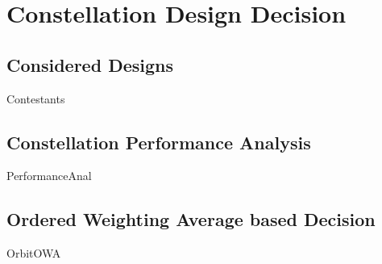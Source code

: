 \chapter{Constellation Design Decision}

\section{Considered Designs}
{Contestants}

\section{Constellation Performance Analysis}
{PerformanceAnal}

\section{Ordered Weighting Average based Decision}
{OrbitOWA}